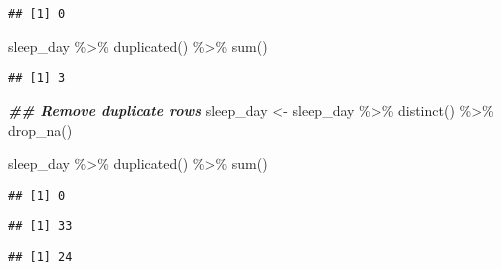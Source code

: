 \documentclass[
]{article}
\newenvironment{Shaded}{\begin{snugshade}}{\end{snugshade}}
\newcommand{\DocumentationTok}[1]{\textcolor[rgb]{0.56,0.35,0.01}{\textbf{\textit{#1}}}}
\newcommand{\FunctionTok}[1]{\textcolor[rgb]{0.00,0.00,0.00}{#1}}
\newcommand{\NormalTok}[1]{#1}
\newcommand{\OtherTok}[1]{\textcolor[rgb]{0.56,0.35,0.01}{#1}}
\newcommand{\SpecialCharTok}[1]{\textcolor[rgb]{0.00,0.00,0.00}{#1}}
\begin{document}
\begin{verbatim}
## [1] 0
\end{verbatim}

\begin{Shaded}
\begin{Highlighting}[]
\NormalTok{sleep\_day }\SpecialCharTok{\%\textgreater{}\%}
  \FunctionTok{duplicated}\NormalTok{() }\SpecialCharTok{\%\textgreater{}\%}
  \FunctionTok{sum}\NormalTok{()}
\end{Highlighting}
\end{Shaded}

\begin{verbatim}
## [1] 3
\end{verbatim}

\begin{Shaded}
\begin{Highlighting}[]
\DocumentationTok{\#\# Remove duplicate rows}
\NormalTok{sleep\_day }\OtherTok{\textless{}{-}}\NormalTok{ sleep\_day }\SpecialCharTok{\%\textgreater{}\%}
  \FunctionTok{distinct}\NormalTok{() }\SpecialCharTok{\%\textgreater{}\%}
  \FunctionTok{drop\_na}\NormalTok{()}

\NormalTok{sleep\_day }\SpecialCharTok{\%\textgreater{}\%}
  \FunctionTok{duplicated}\NormalTok{() }\SpecialCharTok{\%\textgreater{}\%}
  \FunctionTok{sum}\NormalTok{()}
\end{Highlighting}
\end{Shaded}

\begin{verbatim}
## [1] 0
\end{verbatim}

\begin{Shaded}
\end{Shaded}

\begin{verbatim}
## [1] 33
\end{verbatim}

\begin{Shaded}
\end{Shaded}

\begin{verbatim}
## [1] 24
\end{verbatim}
\end{document}
